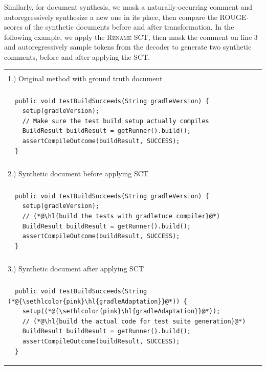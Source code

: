 \documentclass[usenames,dvipsnames]{article} %
\DeclareRobustCommand{\hlred}[1]{{\sethlcolor{pink}\hl{#1}}}
\begin{document}
  Similarly, for document synthesis, we mask a naturally-occurring comment and autoregressively synthesize a new one in its place, then compare the ROUGE-scores of the synthetic documents before and after transformation. In the following example, we apply the \textsc{Rename} SCT, then mask the comment on line 3 and autoregressively sample tokens from the decoder to generate two synthetic comments, before and after applying the SCT.

  \begin{center}
    \begin{tabular}{|p{7.5cm}|}
      \hline\\[-1em]1.) Original method with ground truth document \\[-1em]\\\hline
      \begin{lstlisting}
  public void testBuildSucceeds(String gradleVersion) {
    setup(gradleVersion);
    // Make sure the test build setup actually compiles
    BuildResult buildResult = getRunner().build();
    assertCompileOutcome(buildResult, SUCCESS);
  }
      \end{lstlisting}
      \\\hline\\[-1em]2.) Synthetic document before applying SCT \\[-1em]\\\hline
      \begin{lstlisting}
  public void testBuildSucceeds(String gradleVersion) {
    setup(gradleVersion);
    // (*@\hl{build the tests with gradletuce compiler}@*)
    BuildResult buildResult = getRunner().build();
    assertCompileOutcome(buildResult, SUCCESS);
  }
      \end{lstlisting}
      \\\hline\\[-1em]3.) Synthetic document after applying SCT \\[-1em]\\\hline
      \begin{lstlisting}
  public void testBuildSucceeds(String (*@\hlred{gradleAdaptation}@*)) {
    setup((*@\hlred{gradleAdaptation}@*));
    // (*@\hl{build the actual code for test suite generation}@*)
    BuildResult buildResult = getRunner().build();
    assertCompileOutcome(buildResult, SUCCESS);
  }
      \end{lstlisting}\\\hline
    \end{tabular}
  \end{center}
\end{document}
